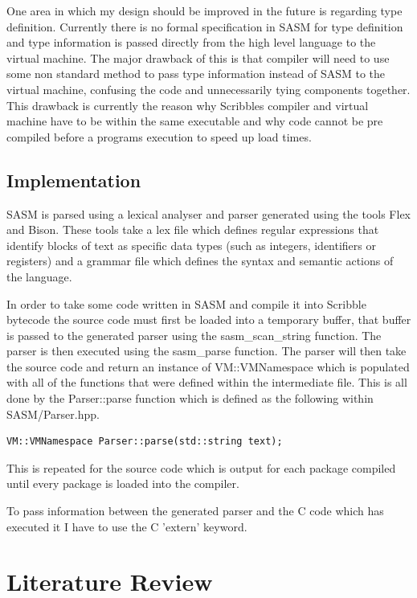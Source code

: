\documentclass[]{final_report}
\begin{document}
One area in which my design should be improved in the future is regarding type definition. Currently there is no formal specification in SASM for type definition and type information is passed directly from the high level language to the virtual machine. The major drawback of this is that compiler will need to use some non standard method to pass type information instead of SASM to the virtual machine, confusing the code and unnecessarily tying components together. This drawback is currently the reason why Scribbles compiler and virtual machine have to be within the same executable and why code cannot be pre compiled before a programs execution to speed up load times.

\section{Implementation}

SASM is parsed using a lexical analyser and parser generated using the tools Flex and Bison. These tools take a lex file which defines regular expressions that identify blocks of text as specific data types (such as integers, identifiers or registers) and a grammar file which defines the syntax and semantic actions of the language.

In order to take some code written in SASM and compile it into Scribble bytecode the source code must first be loaded into a temporary buffer, that buffer is passed to the generated parser using the sasm\_scan\_string function. The parser is then executed using the sasm\_parse function. The parser will then take the source code and return an instance of VM::VMNamespace which is populated with all of the functions that were defined within the intermediate file. This is all done by the Parser::parse function which is defined as the following within SASM/Parser.hpp.

\begin{verbatim}
VM::VMNamespace Parser::parse(std::string text);
\end{verbatim}

This is repeated for the source code which is output for each package compiled until every package is loaded into the compiler.

To pass information between the generated parser and the C code which has executed it I have to use the C 'extern' keyword.

\chapter{Literature Review}
\end{document}
